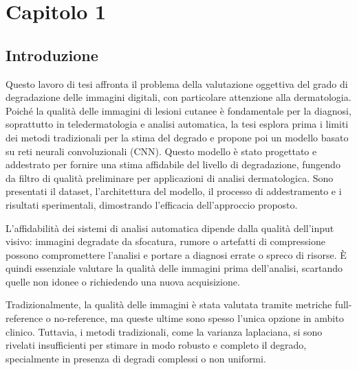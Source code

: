 %
%


\chapter{Capitolo 1}
\label{chap:introduzione}

\section{Introduzione}
Questo lavoro di tesi affronta il problema della valutazione oggettiva del grado di degradazione delle immagini digitali, con particolare attenzione alla dermatologia. Poiché la qualità delle immagini di lesioni cutanee è fondamentale per la diagnosi, soprattutto in teledermatologia e analisi automatica, la tesi esplora prima i limiti dei metodi tradizionali per la stima del degrado e propone poi un modello basato su reti neurali convoluzionali (CNN). Questo modello è stato progettato e addestrato per fornire una stima affidabile del livello di degradazione, fungendo da filtro di qualità preliminare per applicazioni di analisi dermatologica. Sono presentati il dataset, l'architettura del modello, il processo di addestramento e i risultati sperimentali, dimostrando l'efficacia dell'approccio proposto.

L'affidabilità dei sistemi di analisi automatica dipende dalla qualità dell'input visivo: immagini degradate da sfocatura, rumore o artefatti di compressione possono compromettere l'analisi e portare a diagnosi errate o spreco di risorse. È quindi essenziale valutare la qualità delle immagini prima dell'analisi, scartando quelle non idonee o richiedendo una nuova acquisizione.

Tradizionalmente, la qualità delle immagini è stata valutata tramite metriche full-reference o no-reference, ma queste ultime sono spesso l'unica opzione in ambito clinico. Tuttavia, i metodi tradizionali, come la varianza laplaciana, si sono rivelati insufficienti per stimare in modo robusto e completo il degrado, specialmente in presenza di degradi complessi o non uniformi.

